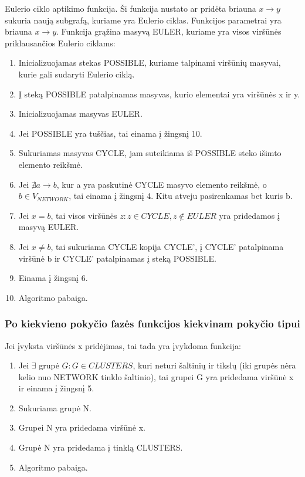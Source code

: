 Eulerio ciklo aptikimo funkcija. Ši funkcija nustato ar pridėta briauna $x \rightarrow y$ sukuria naują subgrafą, kuriame yra Eulerio ciklas. Funkcijos parametrai yra briauna $x \rightarrow y$. Funkcija grąžina masyvą EULER, kuriame yra visos viršūnės priklausančios Eulerio ciklams:
\begin{enumerate}
	\item Inicializuojamas stekas POSSIBLE, kuriame talpinami viršūnių masyvai, kurie gali sudaryti Eulerio ciklą.
	\item Į steką POSSIBLE patalpinamas masyvas, kurio elementai yra viršūnės x ir y.
	\item Inicializuojamas masyvas EULER.
	\item Jei POSSIBLE yra tuščias, tai einama į žingsnį 10.
	\item Sukuriamas masyvas CYCLE, jam suteikiama iš POSSIBLE steko išimto elemento reikšmė.
	\item Jei $\nexists a \rightarrow b$, kur a yra paskutinė CYCLE masyvo elemento reikšmė, o $b \in V_{NETWORK}$, tai einama į žingsnį 4. Kitu atveju pasirenkamas bet kuris b.
	\item Jei $x = b$, tai visos viršūnės $z : z \in CYCLE, z \notin EULER$ yra pridedamos į masyvą EULER.
	\item Jei $x \neq b$, tai sukuriama CYCLE kopija CYCLE', į CYCLE' patalpinama viršūnė b ir CYCLE' patalpinamas į steką POSSIBLE.
	\item Einama į žingsnį 6.
	\item Algoritmo pabaiga. 
\end{enumerate}

\subsubsection{Po kiekvieno pokyčio fazės funkcijos kiekvinam pokyčio tipui}

Jei įvyksta viršūnės x pridėjimas, tai tada yra įvykdoma funkcija:
\begin{enumerate}
	\item Jei $\exists$ grupė $G : G \in CLUSTERS$, kuri neturi šaltinių ir tikslų (iki grupės nėra kelio nuo NETWORK tinklo šaltinio), tai grupei G yra pridedama viršūnė x ir einama į žingsnį 5.
	\item Sukuriama grupė N.
	\item Grupei N  yra pridedama viršūnė x.
	\item Grupė N  yra pridedama į tinklą CLUSTERS.
	\item Algoritmo pabaiga. 
\end{enumerate}

